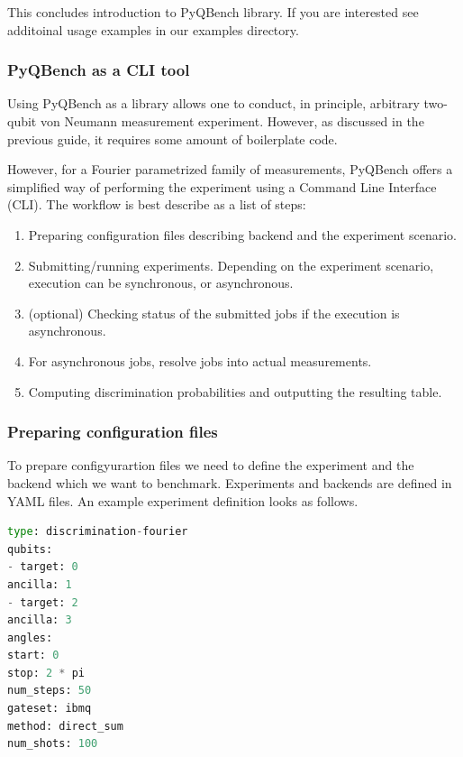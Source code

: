 \documentclass[preprint,12pt, a4paper, dvipsnames]{elsarticle}
\newcommand{\1}{{\rm 1\hspace{-0.9mm}l}}
\begin{document}
This concludes introduction to PyQBench library. If you are interested see additoinal usage examples in our examples directory.



\subsubsection{PyQBench as a CLI tool}\label{sec:pyqbench-as-cli}
Using PyQBench as a library allows one to conduct, in principle, arbitrary two-qubit von Neumann measurement experiment. However, as discussed in the previous guide, it requires some amount of boilerplate code.

However, for a Fourier parametrized family of measurements, PyQBench offers a simplified way of performing the experiment using a Command Line Interface (CLI).
The workflow is best describe as a list of steps:

\begin{enumerate}

\item Preparing configuration files describing backend and the experiment scenario.
\item Submitting/running experiments. Depending on the experiment scenario, execution can be synchronous, or asynchronous.
\item (optional) Checking status of the submitted jobs if the execution is asynchronous.
\item For asynchronous jobs, 
resolve jobs into actual measurements.
\item Computing discrimination probabilities and outputting the resulting table.
\end{enumerate} 
\subsubsection{Preparing configuration files}
To prepare configyurartion files we need to define the experiment and the   backend 
which we want to benchmark. Experiments and backends are defined in YAML files. An example experiment definition looks as follows.


\begin{lstlisting}[language=Python, caption=Defining the experiment]
type: discrimination-fourier
qubits:
- target: 0
ancilla: 1
- target: 2
ancilla: 3
angles:
start: 0
stop: 2 * pi
num_steps: 50
gateset: ibmq
method: direct_sum
num_shots: 100
\end{lstlisting}
\end{document}
